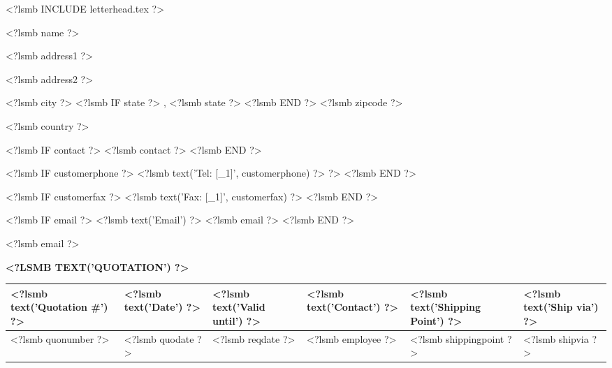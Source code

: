 \documentclass{scrartcl}
\begin{document}
\pagestyle{myheadings}
\thispagestyle{empty}

\newsavebox{\ftr}

<?lsmb INCLUDE letterhead.tex ?>



\vspace*{0.5cm}

\parbox[t]{.5\textwidth}{

<?lsmb name ?>

<?lsmb address1 ?>

<?lsmb address2 ?>

<?lsmb city ?>
<?lsmb IF state ?>
\hspace{-0.1cm}, <?lsmb state ?>
<?lsmb END ?>
<?lsmb zipcode ?>

<?lsmb country ?>

\vspace{0.3cm}

<?lsmb IF contact ?>
<?lsmb contact ?>
\vspace{0.2cm}
<?lsmb END ?>

<?lsmb IF customerphone ?>
<?lsmb text('Tel: [_1]', customerphone) ?> ?>
<?lsmb END ?>

<?lsmb IF customerfax ?>
<?lsmb text('Fax: [_1]', customerfax) ?>
<?lsmb END ?>

<?lsmb IF email ?>
<?lsmb text('Email') ?> <?lsmb email ?>
<?lsmb END ?>

<?lsmb email ?>

}

\vspace{1cm}

\textbf{\MakeUppercase{<?lsmb text('Quotation') ?>}}
\hfill

\vspace{1cm}

\begin{tabularx}{\textwidth}{*{6}{|X}|} \hline
  \textbf{<?lsmb text('Quotation #') ?>} & \textbf{<?lsmb text('Date') ?>} 
  & \textbf{<?lsmb text('Valid until') ?>} & \textbf{<?lsmb text('Contact') ?>} 
  & \textbf{<?lsmb text('Shipping Point') ?>} 
  & \textbf{<?lsmb text('Ship via') ?>} \\ [0.5ex]
  \hline
  <?lsmb quonumber ?> & <?lsmb quodate ?> & <?lsmb reqdate ?> & <?lsmb employee ?> & <?lsmb shippingpoint ?> & <?lsmb shipvia ?> \\
  \hline
\end{tabularx}
  
\end{document}
